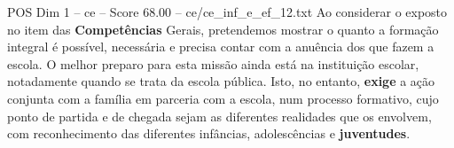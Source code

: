 \begin{textsample}{POS Dim 1 – ce – Score 68.00 – ce/ce\_inf\_e\_ef\_12.txt}
Ao considerar o exposto no item das \textbf{Competências} Gerais, pretendemos mostrar o quanto a formação integral é possível, necessária e precisa contar com a anuência dos que fazem a escola.
O melhor preparo para esta missão ainda está na instituição escolar, notadamente quando se trata da escola pública.
Isto, no entanto, \textbf{exige} a ação conjunta com a família em parceria com a escola, num processo formativo, cujo ponto de partida e de chegada sejam as diferentes realidades que os envolvem, com reconhecimento das diferentes infâncias, adolescências e \textbf{juventudes}.

\end{textsample}
